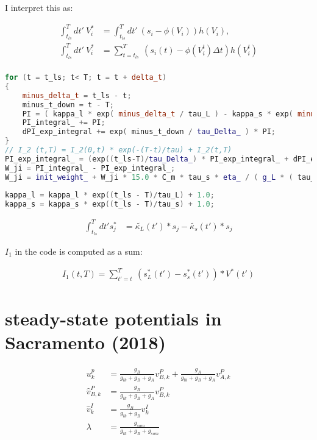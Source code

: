 I interpret this as:


\begin{align}
  \int_{t_{ls}}^T dt' \ V_i^* & = \int_{t_{ls}}^T dt' \  (s_i - \phi(V_i )) h(V_i),               \\
  \int_{t_{ls}}^T dt' \ V_i^* & = \sum_{t=t_{ls}}^T \  (s_i(t) -  \phi(V_i^t ) \Delta t) h(V_i^t) \\
\end{align}

\begin{lstlisting}[language=C++, directivestyle={\color{black}}
                   emph={int,char,double,float,unsigned,exp},
                   emphstyle={\color{blue}}]
for (t = t_ls; t< T; t = t + delta_t)
{
   	minus_delta_t = t_ls - t;
    minus_t_down = t - T;
    PI = ( kappa_l * exp( minus_delta_t / tau_L ) - kappa_s * exp( minus_delta_t / tau_s ) ) * V_star(t);
    PI_integral_ += PI;
    dPI_exp_integral += exp( minus_t_down / tau_Delta_ ) * PI;
}  
// I_2 (t,T) = I_2(0,t) * exp(-(T-t)/tau) + I_2(t,T)
PI_exp_integral_ = (exp((t_ls-T)/tau_Delta_) * PI_exp_integral_ + dPI_exp_integral);
W_ji = PI_integral_ - PI_exp_integral_;
W_ji = init_weight_ + W_ji * 15.0 * C_m * tau_s * eta_ / ( g_L * ( tau_L - tau_s ) );    
  
kappa_l = kappa_l * exp((t_ls - T)/tau_L) + 1.0;
kappa_s = kappa_s * exp((t_ls - T)/tau_s) + 1.0;
  \end{lstlisting}


\begin{align}
  \int_{t_{ls}}^T dt' s_j^* & =  \tilde{\kappa_L}(t') * s_j -  \tilde{\kappa_s}(t') * s_j
\end{align}

$I_1$ in the code is computed as a sum:

\begin{align}
  I_1 (t,T) = \sum_{t'=t}^T \ (s_L^*(t') - s_s^*(t')) * V^*(t')
\end{align}


\section{steady-state potentials in Sacramento (2018)}

\begin{align}
  u_k^p           & = \frac{g_B}{g_{lk} + g_B + g_A} v^P_{B,k} + \frac{g_A}{g_{lk} + g_B + g_A} v^P_{A,k} \\
  \hat{v}^P_{B,k} & = \frac{g_B}{g_{lk} + g_B + g_A} v^P_{B,k}                                            \\
  \hat{v}^I_{k}   & = \frac{g_B}{g_{lk} + g_B} v^I_{k}                                                    \\
  \lambda         & = \frac{g_{som}}{g_{lk} + g_B + g_{som}}
\end{align}



